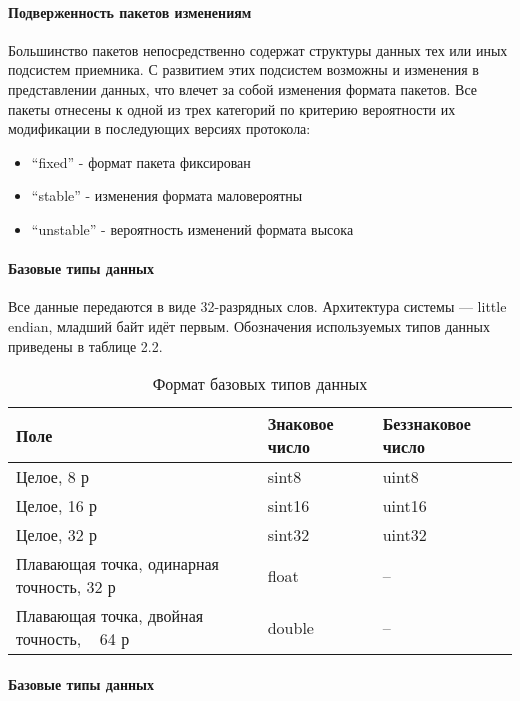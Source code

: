 \paragraph{Подверженность пакетов изменениям}

Большинство пакетов непосредственно содержат структуры данных тех или иных под­систем приемника. С развитием этих подсистем возможны и изменения в представлении
данных, что влечет за собой изменения формата пакетов. Все пакеты отнесены к одной из
трех категорий по критерию вероятности их модификации в последующих версиях протокола:
\begin{itemize}
	\item “fixed” - формат пакета фиксирован
	\item “stable” - изменения формата маловероятны
	\item “unstable” - вероятность изменений формата высока
\end{itemize}

\paragraph{Базовые типы данных}

Все данные передаются в виде 32-разрядных слов. Архитектура системы — little endian,
младший байт идёт первым. Обозначения используемых типов данных приведены в таблице
2.2.
\begin{longtable}[c]{|p{9cm}|l|l|}
	\caption{Формат базовых типов данных} \label{tab:formatbase}\\
	\hline
	Поле & Знаковое число & Беззнаковое число \\
	\hline
	Целое, 8 р & sint8 & uint8 \\

	Целое, 16 р & sint16 & uint16 \\
	
	Целое, 32 р & sint32 & uint32 \\
	
	Плавающая точка, одинарная точность, 32 р & float & -- \\

	Плавающая точка, двойная точность, $\;\;\;$64 р & double & -- \\
	\hline
\end{longtable}

\paragraph{Базовые типы данных}

